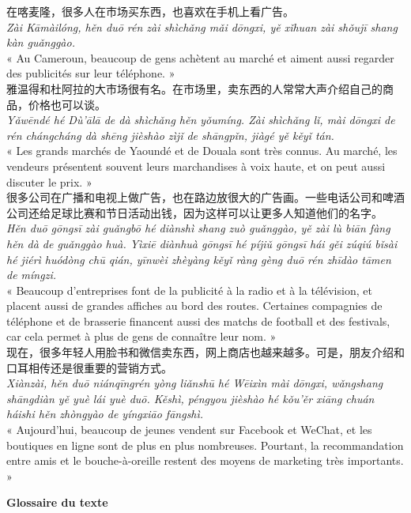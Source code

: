 \documentclass[11pt]{article}
\begin{document}
\begin{textebox}
在喀麦隆，很多人在市场买东西，也喜欢在手机上看广告。\\
\emph{Zài Kāmàilóng, hěn duō rén zài shìchǎng mǎi dōngxi, yě xǐhuan zài shǒujī shang kàn guǎnggào.}\\
« Au Cameroun, beaucoup de gens achètent au marché et aiment aussi regarder des publicités sur leur téléphone. »\\[4pt]
雅温得和杜阿拉的大市场很有名。在市场里，卖东西的人常常大声介绍自己的商品，价格也可以谈。\\
\emph{Yǎwēndé hé Dù'ālā de dà shìchǎng hěn yǒumíng. Zài shìchǎng lǐ, mài dōngxi de rén chángcháng dà shēng jièshào zìjǐ de shāngpǐn, jiàgé yě kěyǐ tán.}\\
« Les grands marchés de Yaoundé et de Douala sont très connus. Au marché, les vendeurs présentent souvent leurs marchandises à voix haute, et on peut aussi discuter le prix. »\\[4pt]
很多公司在广播和电视上做广告，也在路边放很大的广告画。一些电话公司和啤酒公司还给足球比赛和节日活动出钱，因为这样可以让更多人知道他们的名字。\\
\emph{Hěn duō gōngsī zài guǎngbō hé diànshì shang zuò guǎnggào, yě zài lù biān fàng hěn dà de guǎnggào huà. Yìxiē diànhuà gōngsī hé píjiǔ gōngsī hái gěi zúqiú bǐsài hé jiérì huódòng chū qián, yīnwèi zhèyàng kěyǐ ràng gèng duō rén zhīdào tāmen de míngzi.}\\
« Beaucoup d'entreprises font de la publicité à la radio et à la télévision, et placent aussi de grandes affiches au bord des routes. Certaines compagnies de téléphone et de brasserie financent aussi des matchs de football et des festivals, car cela permet à plus de gens de connaître leur nom. »\\[4pt]
现在，很多年轻人用脸书和微信卖东西，网上商店也越来越多。可是，朋友介绍和口耳相传还是很重要的营销方式。\\
\emph{Xiànzài, hěn duō niánqīngrén yòng liǎnshū hé Wēixìn mài dōngxi, wǎngshang shāngdiàn yě yuè lái yuè duō. Kěshì, péngyou jièshào hé kǒu'ěr xiāng chuán háishi hěn zhòngyào de yíngxiāo fāngshì.}\\
« Aujourd'hui, beaucoup de jeunes vendent sur Facebook et WeChat, et les boutiques en ligne sont de plus en plus nombreuses. Pourtant, la recommandation entre amis et le bouche-à-oreille restent des moyens de marketing très importants. »
\end{textebox}

\textbf{Glossaire du texte}
\end{document}
